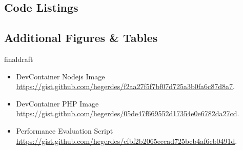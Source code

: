 \documentclass[12pt, a4paper]{article}
\def\draft{draft}
\def\status{final}
\begin{document}
\vspace*{\fill}
\vspace*{\fill}



\subsection{Code Listings}


% 
\newpage

\subsection{Additional Figures \& Tables}
\ifx\status\draft{}
    
    \newpage
\fi



\listoffigures
\listoftables
\lstlistoflistings{}
\vspace{-0.5cm}
\begin{itemize}
    \setlength\itemsep{0em}
    \item DevContainer Nodejs Image  \\ \href{https://gist.github.com/hegerdes/f2aa27f5f7bf07d725a3b0fa6c87d8a7}{https://gist.github.com/hegerdes/f2aa27f5f7bf07d725a3b0fa6c87d8a7}.
    \item DevContainer PHP Image  \\ \href{https://gist.github.com/hegerdes/05de47f669552d17354e0e6782da27cd}{https://gist.github.com/hegerdes/05de47f669552d17354e0e6782da27cd}.
    \item Performance Evaluation Script  \\ \href{https://gist.github.com/hegerdes/cfbf2b2065eccad725bcb4af6cb0491d}{https://gist.github.com/hegerdes/cfbf2b2065eccad725bcb4af6cb0491d}.
\end{itemize}

\newpage


% 
\end{document}
